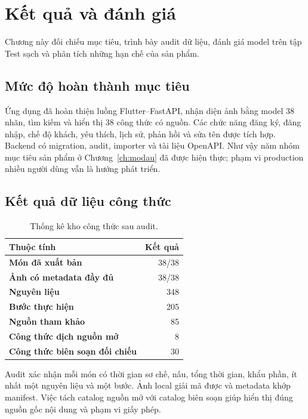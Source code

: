 \chapter{Kết quả và đánh giá}
\label{ch:ketqua}

\begin{muctieu}
Chương này đối chiếu mục tiêu, trình bày audit dữ liệu, đánh giá model trên
tập Test sạch và phân tích những hạn chế của sản phẩm.
\end{muctieu}



\section{Mức độ hoàn thành mục tiêu}

Ứng dụng đã hoàn thiện luồng Flutter--FastAPI, nhận diện ảnh bằng model 38
nhãn, tìm kiếm và hiển thị 38 công thức có nguồn. Các chức năng đăng ký,
đăng nhập, chế độ khách, yêu thích, lịch sử, phản hồi và sửa tên được tích
hợp. Backend có migration, audit, importer và tài liệu OpenAPI. Như vậy năm
nhóm mục tiêu sản phẩm ở Chương~\ref{ch:modau} đã được hiện thực; phạm vi
production nhiều người dùng vẫn là hướng phát triển.

\section{Kết quả dữ liệu công thức}

\begin{table}[htbp]
\centering
\caption{Thống kê kho công thức sau audit.}
\label{tab:recipe-audit}
\begin{tabular}{>{\bfseries}l r}
\toprule
Thuộc tính & Kết quả \\
\midrule
Món đã xuất bản & 38/38 \\
Ảnh có metadata đầy đủ & 38/38 \\
Nguyên liệu & 348 \\
Bước thực hiện & 205 \\
Nguồn tham khảo & 85 \\
Công thức dịch nguồn mở & 8 \\
Công thức biên soạn đối chiếu & 30 \\
\bottomrule
\end{tabular}
\end{table}

Audit xác nhận mỗi món có thời gian sơ chế, nấu, tổng thời gian, khẩu phần,
ít nhất một nguyên liệu và một bước. Ảnh local giải mã được và metadata khớp
manifest. Việc tách catalog nguồn mở với catalog biên soạn giúp hiển thị đúng
nguồn gốc nội dung và phạm vi giấy phép.

